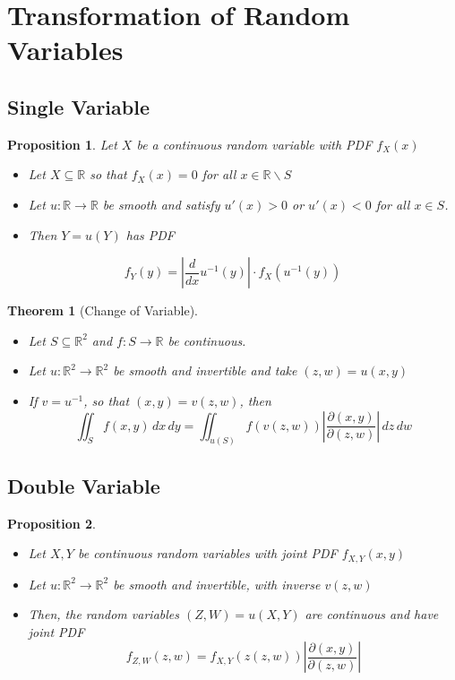 \documentclass[
]{article}
\newtheorem{theorem}{Theorem}[section]
\newtheorem{proposition}{Proposition}[section]
\theoremstyle{definition}
\theoremstyle{definition}
\theoremstyle{definition}
\theoremstyle{remark}
\newcommand{\fxx}{f_X(x)}
\newcommand{\fx}[1]{f_X(#1)}
\newcommand{\R}{\mathbb{R}}
\begin{document}
\section{Transformation of Random Variables}

\subsection{Single Variable}

\begin{proposition}
  Let $X$ be a continuous random variable with PDF $\fxx$
  \begin{itemize}
    \item Let $ X \subseteq \mathbb{R}$ so that $\fxx = 0$ for all $x \in \R \backslash S$
    \item Let $u: \R \rightarrow \R$ be smooth and satisfy $u\prime(x) > 0$ or $u\prime(x) < 0$ for all $x \in S$.
    \item Then $Y = u(Y)$ has PDF
  \end{itemize}
  \[ f_Y(y) = \left\lvert \frac{d}{dx} u^{-1}(y)\right\rvert \cdot \fx{ u^{-1}(y)} \]
\end{proposition}

\begin{theorem} [Change of Variable]
  \begin{itemize}
    \item Let $ S \subseteq \mathbb{R}^2$ and $f: S \rightarrow \R$ be continuous.
    \item Let $u: \R^2 \rightarrow \R^2$ be smooth and invertible and take $(z, w) = u(x, y)$
    \item If $v = u^{-1}$, so that $(x,y) = v(z,w)$, then
          \[\iint_{S}f(x,y) \,dx\,dy = \iint_{u(S)}f(v(z,w))\left\lvert \frac{\partial (x, y)}{\partial (z, w)}\right\rvert \,dz\,dw \]
  \end{itemize}
\end{theorem}

\subsection{Double Variable}

\begin{proposition}
  \begin{itemize}
    \item Let $ X, Y$ be continuous random variables with joint PDF $f_{X,Y}(x,y)$
    \item Let $u: \R^2 \rightarrow \R^2$ be smooth and invertible, with inverse $v(z, w)$
    \item Then, the random variables $(Z,W) = u(X, Y)$ are continuous and have joint PDF
          \[ f_{Z, W}(z,w) = f_{X, Y}(z(z,w))\left\lvert \frac{\partial (x, y)}{\partial (z, w)}\right\rvert \]
  \end{itemize}
\end{proposition}
\end{document}
